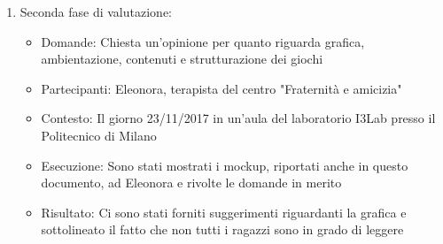 \begin{enumerate}
\begin{itemize}
		\end{itemize}
\newpage
\item Seconda fase di valutazione:
		\begin{itemize}
		\item Domande:  Chiesta un'opinione per quanto riguarda grafica, ambientazione, contenuti e 								strutturazione dei giochi
		\item Partecipanti: Eleonora, terapista del centro "Fraternità e amicizia"
		\item Contesto: Il giorno 23/11/2017 in un'aula del laboratorio I3Lab presso il Politecnico di 								Milano
		\item Esecuzione: Sono stati mostrati i mockup, riportati anche in questo documento, ad Eleonora e 						  rivolte le domande in merito
		\item Risultato: Ci sono stati forniti suggerimenti riguardanti la grafica e sottolineato il fatto 						 che non tutti i ragazzi sono in grado di leggere   
		\end{itemize}
\end{enumerate}


